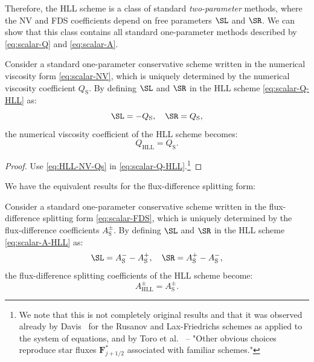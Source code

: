 Therefore, the HLL scheme is a class of standard \textit{two-parameter} methods, where the NV and FDS coefficients depend on free parameters $ \SL $ and $ \SR $. We can show that this class contains all standard one-parameter methods described by \eqref{eq:scalar-Q} and \eqref{eq:scalar-A}.

\begin{lemma} \label{prop:HLL-NV-Qs}
Consider a standard one-parameter conservative scheme written in the numerical viscosity form \eqref{eq:scalar-NV}, which is uniquely determined by the numerical viscosity coefficient $ Q_\text{S} $. By defining $ \SL $ and $ \SR $ in the HLL scheme \eqref{eq:scalar-Q-HLL} as:
\begin{equation} \label{eq:HLL-NV-Qs}
\SL = -Q_\text{S}, \quad \SR = Q_\text{S},
\end{equation}
the numerical viscosity coefficient of the HLL scheme becomes:
\begin{equation}
Q_\text{HLL} = Q_\text{S}.
\end{equation} 
\end{lemma}

\begin{proof}
Use \eqref{eq:HLL-NV-Qs} in \eqref{eq:scalar-Q-HLL}.\footnote{We note that this is not completely original results and that it was observed already by Davis~\cite{dav88} for the Rusanov and Lax-Friedrichs schemes as applied to the system of equations, and by Toro et al.~\cite{tor94} -- "Other obvious choices reproduce star fluxes $ \mathbf{F}_{j+1/2}^* $ associated with familiar schemes."}
\end{proof}

We have the equivalent results for the flux-difference splitting form:
\begin{lemma} \label{prop:HLL-FDS-As}
Consider a standard one-parameter conservative scheme written in the flux-difference splitting form \eqref{eq:scalar-FDS}, which is uniquely determined by the flux-difference coefficients $ A_\text{S}^{\pm} $. By defining $ \SL $ and $ \SR $ in the HLL scheme \eqref{eq:scalar-A-HLL} as:
\begin{equation} \label{eq:HLL-FDS-As}
\SL = A_\text{S}^- - A_\text{S}^+ , \quad \SR = A_\text{S}^+ - A_\text{S}^-,
\end{equation}
the flux-difference splitting coefficients of the HLL scheme become:
\begin{equation} 
A_\text{HLL}^{\pm} = A_\text{S}^{\pm}.
\end{equation} 
\end{lemma}

